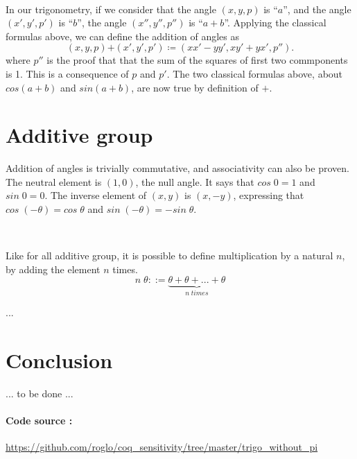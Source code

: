 \documentclass[11pt]{article}
\theoremstyle{definition}
\begin{document}
\

\noindent In our trigonometry, if we consider that the angle $(x, y,
p)$ is ``$a$'', and the angle $(x', y', p')$ is ``$b$'', the angle
$(x'', y'', p'')$ is ``$a + b$''. Applying the classical formulas
above, we can define the addition of angles as
\[
(x, y, p) \boldsymbol{+} (x', y', p') \coloneqq (x x' - y y', x y' + y
x', p'').
\]
where $p''$ is the proof that that the sum of the squares of first two
commponents is 1. This is a consequence of $p$ and $p'$. The two
classical formulas above, about $cos(a+b)$ and $sin(a+b)$, are now
true by definition of $+$.

\section{Additive group}

Addition of angles is trivially commutative, and associativity can
also be proven. The neutral element is $(1, 0)$, the null angle. It
says that $cos\;0=1$ and $sin\;0=0$. The inverse element of $(x, y)$
is $(x, -y)$, expressing that $cos\;(- \theta) = cos\;\theta$ and
$sin\;(- \theta) = - sin\;\theta$.

\

\noindent Like for all additive group, it is possible to define
multiplication by a natural $n$, by adding the element $n$ times.
\[
  n \; \theta ::=
  \underbrace{\theta + \theta + ... + \theta}_{n \; times}
\]

...

\section{Conclusion}

... to be done ...

\paragraph{Code source :}
\url{https://github.com/roglo/coq_sensitivity/tree/master/trigo_without_pi}
\end{document}
